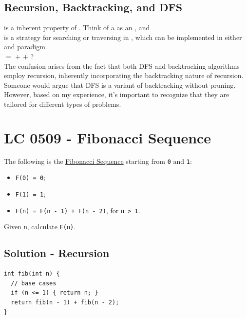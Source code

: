 \subsection{Recursion, Backtracking, and DFS}\label{subsec:recursion_backtracking_dfs}
{\color{blue}{Backtracking}} is a inherent property of {\color{blue}{recursion}}. Think of a {\color{blue}{recursive procedure}} as an {\color{blue}{activation tree}}, and {\color{blue}{backtracking occurs when we return from a current node and the control flow returns to its parent node.}} \\

{\color{blue}{DFS}} is a strategy for searching or traversing in {\color{blue}{graphs}}, which can be implemented in either {\color{blue}{recursive}} and {\color{blue}{iterative}} paradigm. \\

{\color{blue}{Backtracking algorithms}} $=$ {\color{blue}{DFS}} $+$ {\color{blue}{state control}} $+$ {\color{blue}{pruning}}?\\

The confusion arises from the fact that both DFS and backtracking algorithms employ recursion, inherently incorporating the backtracking nature of recursion. Someone would argue that DFS is a variant of backtracking without pruning. However, based on my experience, it's important to recognize that they are tailored for different types of problems. {\color{blue}{So don't mix DFS and backtracking algorithms up!!!}}

\section{LC 0509 - Fibonacci Sequence}
The following is the \ul{Fibonacci Sequence} starting from {\colorbox{CodeBackground}{\lstinline|0|}} and {\colorbox{CodeBackground}{\lstinline|1|}}:
\begin{itemize}
\item {\colorbox{CodeBackground}{\lstinline|F(0) = 0|}};
\item {\colorbox{CodeBackground}{\lstinline|F(1) = 1|}};
\item {\colorbox{CodeBackground}{\lstinline|F(n) = F(n - 1) + F(n - 2)|}}, for {\colorbox{CodeBackground}{\lstinline|n > 1|}}.
\end{itemize}

Given {\colorbox{CodeBackground}{\lstinline|n|}}, calculate {\colorbox{CodeBackground}{\lstinline|F(n)|}}.

\subsection*{Solution - Recursion}\label{solution:lc0509_recursion}
\begin{lstlisting}
int fib(int n) {
  // base cases
  if (n <= 1) { return n; }
  return fib(n - 1) + fib(n - 2);
}
\end{lstlisting}

